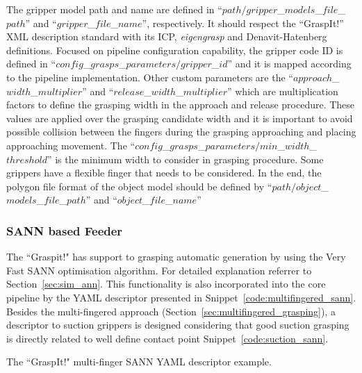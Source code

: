 The gripper model path and name are defined in ``$path/gripper$\_$models$\_$file$\_$path$'' and ``$gripper$\_$file$\_$name$'', respectively. It should respect the ``GraspIt!'' XML description standard with its \ac{ICP}, \textit{eigengrasp} and Denavit-Hatenberg definitions. Focused on pipeline configuration capability, the gripper code ID is defined in ``$config$\_$grasps$\_$parameters/gripper$\_$id$'' and it is mapped according to the pipeline implementation. Other custom parameters are the ``$approach$\_$width$\_$multiplier$'' and ``$release$\_$width$\_$multiplier$'' which are multiplication factors to define the grasping width in the approach and release procedure. These values are applied over the grasping candidate width and it is important to avoid possible collision between the fingers during the grasping approaching and placing approaching movement.  The ``$config$\_$grasps$\_$parameters/min$\_$width$\_$threshold$'' is the minimum width to consider in grasping procedure. Some grippers have a flexible finger that needs to be considered.
In the end, the polygon file format of the object model should be defined by ``$path/object$\_$models$\_$file$\_$path$'' and ``$object$\_$file$\_$name$''


\subsubsection{\acl{SANN} based Feeder}
\label{cap4:modular_grasping_architecture:sec:grasping_synthesis:subsec:graspit:subsubsec:sann}

The ``Graspit!" has support to grasping automatic generation by using the Very Fast \acl{SANN} optimisation algorithm. For detailed explanation referrer to Section~\ref{sec:sim_ann}. This functionality is also incorporated into the core pipeline by the YAML descriptor presented in Snippet~\ref{code:multifingered_sann}. Besides the multi-fingered approach (Section~\ref{sec:multifingered_grasping}), a descriptor to suction grippers is designed considering that good suction grasping is directly related to well define contact point Snippet~\ref{code:suction_sann}.



\begin{snippet}[h!]
\centering
{}
\caption{The ``GraspIt!" multi-finger \ac{SANN} YAML descriptor example.}
\label{code:multifingered_sann}
\end{snippet}

